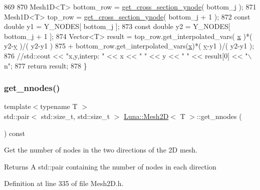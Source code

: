 \begin{DoxyCode}
869 
870     Mesh1D<T> bottom\_row = \hyperlink{classLuna_1_1Mesh2D_ad73c523ff66dc2d481370cd774c8e7e4}{get\_cross\_section\_ynode}( bottom\_j );
871     Mesh1D<T> top\_row = \hyperlink{classLuna_1_1Mesh2D_ad73c523ff66dc2d481370cd774c8e7e4}{get\_cross\_section\_ynode}( bottom\_j + 1 );
872     \textcolor{keyword}{const} \textcolor{keywordtype}{double} y1 = Y\_NODES[ bottom\_j ];
873     \textcolor{keyword}{const} \textcolor{keywordtype}{double} y2 = Y\_NODES[ bottom\_j + 1 ];
874     Vector<T> result = top\_row.get\_interpolated\_vars( \hyperlink{namespaceHeat__plot_aa88370c16b85b784ccbde3ed88bc1991}{x} )*( y2-\hyperlink{ODE__BVP__test_8cpp_adf764cbdea00d65edcd07bb9953ad2b7ae1f9fdb8b786c63efc4ce44eeacd17f2}{y} )/( y2-y1 )
875       + bottom\_row.get\_interpolated\_vars(\hyperlink{namespaceHeat__plot_aa88370c16b85b784ccbde3ed88bc1991}{x})*( \hyperlink{ODE__BVP__test_8cpp_adf764cbdea00d65edcd07bb9953ad2b7ae1f9fdb8b786c63efc4ce44eeacd17f2}{y}-y1 )/( y2-y1 );
876     \textcolor{comment}{//std::cout << "x,y,interp: " << x << " " << y << " " << result[0] << "\(\backslash\)n";}
877     \textcolor{keywordflow}{return} result;
878   \}
\end{DoxyCode}
\mbox{\label{classLuna_1_1Mesh2D_a8e154c77471f89bc056b2950b26f1d80}} 
\subsubsection{\texorpdfstring{get\+\_\+nnodes()}{get\_nnodes()}}
{\footnotesize\ttfamily template$<$typename T $>$ \\
std\+::pair$<$ std\+::size\+\_\+t, std\+::size\+\_\+t $>$ \hyperlink{classLuna_1_1Mesh2D}{Luna\+::\+Mesh2D}$<$ T $>$\+::get\+\_\+nnodes (\begin{DoxyParamCaption}{ }\end{DoxyParamCaption}) const}



Get the number of nodes in the two directions of the 2D mesh. 

\begin{DoxyReturn}{Returns}
A std\+::pair containing the number of nodes in each direction 
\end{DoxyReturn}


Definition at line 335 of file Mesh2\+D.\+h.



